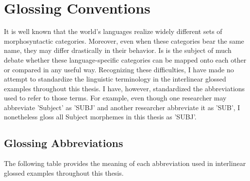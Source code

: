 \chapter{Glossing Conventions}

It is well known that the world's languages realize widely different sets of morphosyntactic categories. Moreover, even when these categories bear the same name, they may differ drastically in their behavior. Is is the subject of much debate whether these language-specific categories can be mapped onto each other or compared in any useful way. Recognizing these difficulties, I have made no attempt to standardize the linguistic terminology in the interlinear glossed examples throughout this thesis. I have, however, standardized the abbreviations used to refer to those terms. For example, even though one researcher may abbreviate 'Subject' as 'SUBJ' and another researcher abbreviate it as 'SUB', I nonetheless gloss all Subject morphemes in this thesis as 'SUBJ'.

\section{Glossing Abbreviations}

The following table provides the meaning of each abbreviation used in interlinear glossed examples throughout this thesis.

